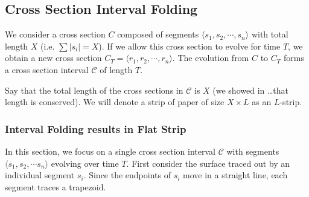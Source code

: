 \subsection{Cross Section Interval Folding}
\label{sec:interval_folding}

\begin{definition}
\label{def:interval}
We consider a cross section $C$ composed of segments $ \langle s_1,s_2,\cdots,s_n \rangle$
with total length $X$ (i.e. $\sum \left| s_i\right| = X$).
If we allow this cross section to evolve for time $T$, we obtain a new cross section $C_T = \langle r_1,r_2,\cdots ,r_n \rangle$.
The evolution from $C$ to $C_T$ forms a cross section interval $\mathcal C$ of length $T$.
\end{definition}

\begin{definition}
\label{def:}
Say that the total length of the cross sections in $\mathcal C$ is $X$ (we showed in \ldots that length is conserved).
We will denote a strip of paper of size $X\times L$ as an $L$-strip.
\end{definition}

\subsubsection{Interval Folding results in Flat Strip}
\label{sec:interval_flat_strip}

In this section, we focus on a single cross section interval $\mathcal C$ with segments $\langle s_1, s_2,\cdots s_n \rangle$ evolving over time $T$.
First consider the surface traced out by an individual segment $s_i$.
Since the endpoints of $s_i$ move in a straight line, each segment traces  a trapezoid.

\begin{figure}[htb]
\graphicspath{{./figures/}}
    \centering
    \hspace{-9em}
    \caption{}
    \label{fig:trapezoids}
\end{figure}

